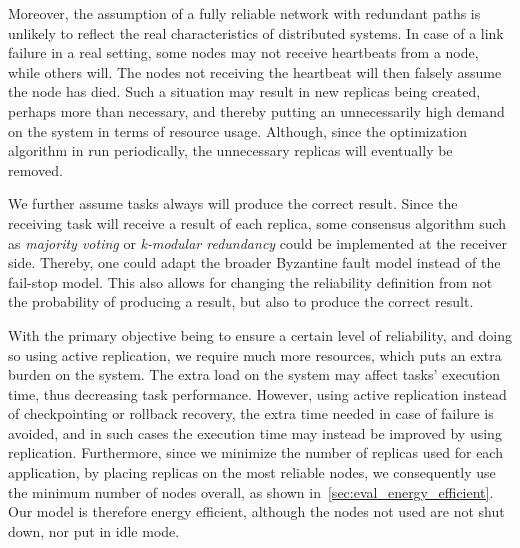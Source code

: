 \documentclass{cslthse-msc}
\begin{document}
Moreover, the assumption of a fully reliable network with redundant paths is unlikely to reflect the real characteristics of distributed systems. In case of a link failure in a real setting, some nodes may not receive heartbeats from a node, while others will. The nodes not receiving the heartbeat will then falsely assume the node has died. Such a situation may result in new replicas being created, perhaps more than necessary, and thereby putting an unnecessarily high demand on the system in terms of resource usage. Although, since the optimization algorithm in run periodically, the unnecessary replicas will eventually be removed.

We further assume tasks always will produce the correct result. Since the receiving task will receive a result of each replica, some consensus algorithm such as \emph{majority voting} or \emph{k-modular redundancy} could be implemented at the receiver side. Thereby, one could adapt the broader Byzantine fault model instead of the fail-stop model. This also allows for changing the reliability definition from not the probability of producing a result, but also to produce the correct result.

With the primary objective being to ensure a certain level of reliability, and doing so using active replication, we require much more resources, which puts an extra burden on the system. The extra load on the system may affect tasks' execution time, thus decreasing task performance. However, using active replication instead of checkpointing or rollback recovery, the extra time needed in case of failure is avoided, and in such cases the execution time may instead be improved by using replication. Furthermore, since we minimize the number of replicas used for each application, by placing replicas on the most reliable nodes, we consequently use the minimum number of nodes overall, as shown in~\cref{sec:eval_energy_efficient}. Our model is therefore energy efficient, although the nodes not used are not shut down, nor put in idle mode.
\end{document}

